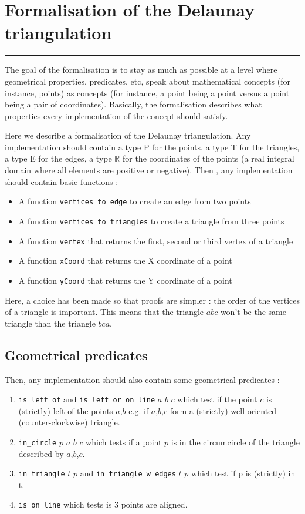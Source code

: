 \documentclass[a4paper,10pt]{article}
\begin{document}
\section{Formalisation of the Delaunay triangulation}
\rule{\linewidth}{0.5pt}

The goal of the formalisation is to stay as much as possible at a level where geometrical properties, predicates, etc, speak about mathematical concepts (for instance, points) as concepts (for instance, a point being a point versus a point being a pair of coordinates). Basically, the formalisation describes what properties every implementation of the concept should satisfy.

Here we describe a formalisation of the Delaunay triangulation. Any implementation should contain a type P for the points, a type T for the triangles, a type E for the edges, a type $\mathbb{R}$ for the coordinates of the points (a real integral domain where all elements are positive or negative).
Then , any implementation should contain basic functions :
\begin{itemize}
\item A function {\tt vertices\_to\_edge} to create an edge from two points
\item A function {\tt vertices\_to\_triangles} to create a triangle from three points
\item A function {\tt vertex}  that returns the first, second or third vertex of a triangle
\item A function {\tt xCoord} that returns the X coordinate of a point
\item A function {\tt yCoord} that returns the Y coordinate of a point
\end{itemize}

Here, a choice has been made so that proofs are simpler : the order of the vertices of a triangle is important. This means that the triangle $abc$ won't be the same triangle than the triangle $bca$.

\subsection{Geometrical predicates}

Then, any implementation should also contain some geometrical predicates :
\begin{enumerate}
\item {\tt is\_left\_of} and {\tt is\_left\_or\_on\_line} $a$ $b$ $c$ which test if the point $c$ is (strictly) left of the points $a$,$b$ e.g. if $a$,$b$,$c$ form a (strictly) well-oriented (counter-clockwise) triangle.
\item {\tt in\_circle} $p$ $a$ $b$ $c$ which tests if a point $p$ is in the circumcircle of the triangle described by $a$,$b$,$c$.
\item {\tt in\_triangle} $t$ $p$ and {\tt in\_triangle\_w\_edges} $t$ $p$ which test if p is (strictly) in t.
  \item {\tt is\_on\_line} which tests is 3 points are aligned.

\end{enumerate}
\end{document}
